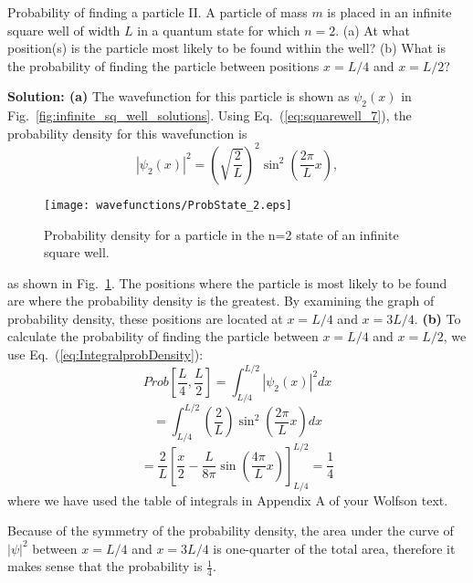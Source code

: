 \begin{example}{Probability of finding a particle II.}
A particle of mass $m$ is placed in an infinite square well of width
$L$ in a quantum state for which $n = 2$. (a) At what position(s) is
the particle most likely to be found within the well?  (b) What is the
probability of finding the particle between positions $x = L/4$ and $x
= L/2$?

{\bf Solution: (a)} The wavefunction for this particle is shown as
$\psi_2(x)$ in Fig.~\ref{fig:infinite_sq_well_solutions}.  Using
Eq.~(\ref{eq:squarewell_7}), the probability density for this
wavefunction is
\begin{equation}
|\psi_2(x)|^2 = \left(\sqrt{\frac{2}{L}} \right)^2 \sin^2\left(\frac{2 \pi}{L}x\right) ,
\end{equation}

\begin{figure}[!tb]
\begin{center}
\texttt{[image: wavefunctions/ProbState\_2.eps]}
\end{center}
\caption{Probability density for a particle in the n=2 state of an infinite square well.}
\label{fig:ProbState_2}
\end{figure}

\noindent as shown in Fig.~\ref{fig:ProbState_2}. The positions
where the particle is most likely to be found are where the
probability density is the greatest. By examining the graph of
probability density, these positions are located at $x = L/4$ and $x =
3L/4$.  {\bf (b)} To calculate the probability of finding the particle
between $x = L/4$ and $x = L/2$, we use 
Eq.~(\ref{eq:IntegralprobDensity}):
\begin{equation}
Prob\left[\frac{L}{4}, \frac{L}{2}\right] = \int_{L/4}^{L/2} |\psi_2(x)|^2 dx \nonumber 
\end{equation}
\begin{equation}
 = \int_{L/4}^{L/2} \left(\frac{2}{L}\right) \sin^2\left(\frac{2 \pi}{L}x\right) dx
\nonumber 
\end{equation}
\begin{equation}
 = \frac{2}{L} \left[\frac{x}{2} - \frac{L}{8 \pi}\sin \left(\frac{4 \pi}{L}x\right) \right]_{L/4}^{L/2} =
 \frac{1}{4} \nonumber
\end{equation}
\noindent where we have used the table of integrals in Appendix A of
your Wolfson text.

Because of the symmetry of the probability density, the area under the
curve of $\left|\psi\right|^2$ between $x = L/4$ and $x = 3L/4$ is
one-quarter of the total area, therefore it makes sense that the
probability is $\frac{1}{4}$.
\end{example}
